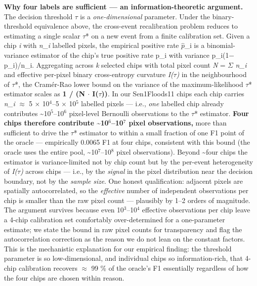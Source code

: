 \documentclass[sn-nature,lineno]{sn-jnl}
\theoremstyle{thmstyleone}
\theoremstyle{thmstyletwo}
\theoremstyle{thmstylethree}
\begin{document}
\textbf{Why four labels are sufficient --- an information-theoretic argument.}
The decision threshold $\tau$ is a \emph{one-dimensional} parameter. Under the
binary-threshold equivalence above, the cross-event recalibration
problem reduces to estimating a single scalar $\tau$* on a new event from a
finite calibration set. Given a chip \emph{i} with \emph{n\_i} labelled pixels,
the empirical positive rate \(\hat{p}\)\_i is a binomial-variance estimator of
the chip's true positive rate p\_i with variance p\_i(1$-$p\_i)/n\_i.
Aggregating across \emph{k} selected chips with total pixel count \emph{N} = $\Sigma$
\emph{n\_i} and effective per-pixel binary cross-entropy curvature \emph{I($\tau$)} in
the neighbourhood of $\tau$*, the Cram\'er-Rao lower bound on the variance of
the maximum-likelihood $\tau$* estimator scales as \textbf{1 / (N $\cdot$ I($\tau$))}. In
our Sen1Floods11 chips each chip carries \emph{n\_i} $\approx$ 5 $\times$ 10$^{4}$--5 $\times$ 10$^{5}$
labelled pixels --- i.e., \emph{one} labelled chip already contributes
\textasciitilde10$^{5}$--10$^{6}$ pixel-level Bernoulli observations to the $\tau$* estimator.
\textbf{Four chips therefore contribute \textasciitilde10$^{6}$--10$^{7}$ pixel observations,} more
than sufficient to drive the $\tau$* estimator to within a small fraction
of one F1 point of the oracle --- empirically 0.0065 F1 at four chips,
consistent with this bound (the oracle uses the
entire pool, \textasciitilde10$^{7}$--10$^{8}$ pixel observations). Beyond \textasciitilde four chips the
estimator is variance-limited not by chip count but by the per-event
heterogeneity of \emph{I($\tau$)} across chips --- i.e., by the \emph{signal} in the
pixel distribution near the decision boundary, not by the \emph{sample
size}. One honest qualification: adjacent pixels are spatially
autocorrelated, so the \emph{effective} number of independent observations
per chip is smaller than the raw pixel count --- plausibly by 1--2 orders
of magnitude. The argument survives because even 10$^{3}$--10$^{4}$ effective
observations per chip leave a 4-chip calibration set comfortably
over-determined for a one-parameter estimate; we state the bound in
raw pixel counts for transparency and flag the autocorrelation
correction as the reason we do not lean on the constant factors.
This is the mechanistic explanation for our empirical finding:
the threshold parameter is so low-dimensional, and individual chips so
information-rich, that 4-chip calibration recovers $\approx$ 99 \% of the
oracle's F1 essentially regardless of how the four chips are chosen
within reason.
\end{document}
